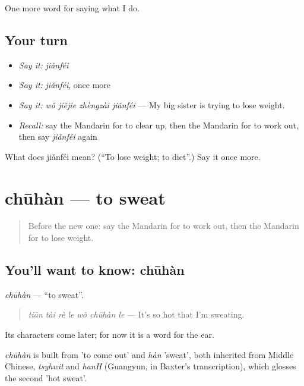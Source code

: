\begin{grammarlens}[title={What you've built}]
One more word for saying what I do.
\end{grammarlens}

\subsection*{Your turn}
\begin{itemize}
\raggedright
  \item \emph{Say it:} \emph{jiǎnféi}
  \item \emph{Say it:} \emph{jiǎnféi}, once more
  \item \emph{Say it:} \emph{wǒ jiějie zhèngzài jiǎnféi} — My big sister is trying to lose weight.
  \item \emph{Recall:} say the Mandarin for to clear up, then the Mandarin for to work out, then say \emph{jiǎnféi} again
\end{itemize}

\begin{tcolorbox}[breakable,colback=teal!4,colframe=teal!35!black,title={Before you move on}]
What does jiǎnféi mean? (\textquotedblleft{}To lose weight; to diet\textquotedblright{}.) Say it once more.
\end{tcolorbox}
\section[chūhàn]{chūhàn — to sweat}

\label{lesson:ZH-C220-chuhan}



\begin{quote}
Before the new one: say the Mandarin for to work out, then the Mandarin for to lose weight.
\end{quote}

\subsection*{You'll want to know: chūhàn}
\emph{chūhàn} — \textquotedblleft{}to sweat\textquotedblright{}.

\begin{quote}
\emph{tiān tài rè le wǒ chūhàn le} — It's so hot that I'm sweating.
\end{quote}

Its characters come later; for now it is a word for the ear.

\begin{cousinweb}
\emph{chūhàn} is built from  'to come out' and \emph{hàn} 'sweat', both inherited from Middle Chinese, \emph{tsyhwit} and \emph{hanH} (Guangyun, in Baxter's transcription), which glosses the second 'hot sweat'.
\end{cousinweb}

